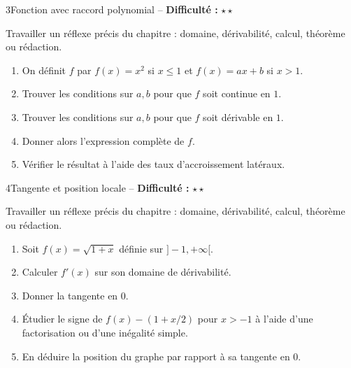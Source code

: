 \documentclass[11pt,a4paper]{article}
\newcommand{\etoiles}[1]{\textbf{Difficulté :} #1}
\begin{document}
\begin{exobox}{3}{Fonction avec raccord polynomial -- \etoiles{$\star\star$}}

\begin{objectifbox}
Travailler un réflexe précis du chapitre : domaine, dérivabilité, calcul, théorème ou rédaction.
\end{objectifbox}

\begin{enumerate}

\item On définit $f$ par $f(x)=x^2$ si $x\leq1$ et $f(x)=ax+b$ si $x>1$.

\item Trouver les conditions sur $a,b$ pour que $f$ soit continue en $1$.

\item Trouver les conditions sur $a,b$ pour que $f$ soit dérivable en $1$.

\item Donner alors l'expression complète de $f$.

\item Vérifier le résultat à l'aide des taux d'accroissement latéraux.

\end{enumerate}

\end{exobox}


\begin{exobox}{4}{Tangente et position locale -- \etoiles{$\star\star$}}

\begin{objectifbox}
Travailler un réflexe précis du chapitre : domaine, dérivabilité, calcul, théorème ou rédaction.
\end{objectifbox}

\begin{enumerate}

\item Soit $f(x)=\sqrt{1+x}$ définie sur $]-1,+\infty[$.

\item Calculer $f'(x)$ sur son domaine de dérivabilité.

\item Donner la tangente en $0$.

\item Étudier le signe de $f(x)-(1+x/2)$ pour $x>-1$ à l'aide d'une factorisation ou d'une inégalité simple.

\item En déduire la position du graphe par rapport à sa tangente en $0$.

\end{enumerate}

\end{exobox}
\end{document}
